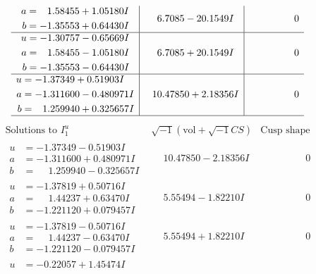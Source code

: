 \documentclass[1p]{elsarticle_modified}
\theoremstyle{definition}
\newcommand{\I}{\sqrt{-1}}
\begin{document}
$$\begin{array}{c|c|c}
\begin{aligned}
a &= \phantom{-}1.58455 + 1.05180 I \\
b &= -1.35553 + 0.64430 I\end{aligned}
 & \phantom{-}6.7085 - 20.1549 I & \phantom{-0.000000 } 0 \\ \hline\begin{aligned}
u &= -1.30757 - 0.65669 I \\
a &= \phantom{-}1.58455 - 1.05180 I \\
b &= -1.35553 - 0.64430 I\end{aligned}
 & \phantom{-}6.7085 + 20.1549 I & \phantom{-0.000000 } 0 \\ \hline\begin{aligned}
u &= -1.37349 + 0.51903 I \\
a &= -1.311600 - 0.480971 I \\
b &= \phantom{-}1.259940 + 0.325657 I\end{aligned}
 & \phantom{-}10.47850 + 2.18356 I & \phantom{-0.000000 } 0\\
 \hline 
 \end{array}$$\newpage$$\begin{array}{c|c|c}  
\text{Solutions to }I^u_{1}& \I (\text{vol} + \sqrt{-1}CS) & \text{Cusp shape}\\
 \hline 
\begin{aligned}
u &= -1.37349 - 0.51903 I \\
a &= -1.311600 + 0.480971 I \\
b &= \phantom{-}1.259940 - 0.325657 I\end{aligned}
 & \phantom{-}10.47850 - 2.18356 I & \phantom{-0.000000 } 0 \\ \hline\begin{aligned}
u &= -1.37819 + 0.50716 I \\
a &= \phantom{-}1.44237 + 0.63470 I \\
b &= -1.221120 + 0.079457 I\end{aligned}
 & \phantom{-}5.55494 - 1.82210 I & \phantom{-0.000000 } 0 \\ \hline\begin{aligned}
u &= -1.37819 - 0.50716 I \\
a &= \phantom{-}1.44237 - 0.63470 I \\
b &= -1.221120 - 0.079457 I\end{aligned}
 & \phantom{-}5.55494 + 1.82210 I & \phantom{-0.000000 } 0 \\ \hline\begin{aligned}
u &= -0.22057 + 1.45474 I \\

\end{aligned}
\end{array}$$
\end{document}
